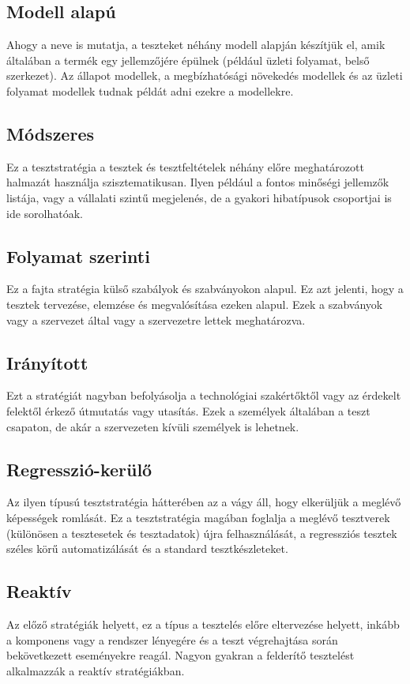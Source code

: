 \subsection{Modell alapú} Ahogy a neve is mutatja, a teszteket néhány modell alapján készítjük el, amik általában a termék egy jellemzőjére épülnek (például üzleti folyamat, belső szerkezet).	Az állapot modellek, a megbízhatósági növekedés modellek és az üzleti folyamat modellek tudnak példát adni ezekre a modellekre.


\subsection{Módszeres} Ez a tesztstratégia a tesztek és tesztfeltételek néhány előre meghatározott halmazát használja szisztematikusan. Ilyen például a fontos minőségi jellemzők listája, vagy a vállalati szintű megjelenés, de a  gyakori hibatípusok csoportjai is ide sorolhatóak.

\subsection{Folyamat szerinti} Ez a fajta stratégia külső szabályok és szabványokon alapul. Ez azt jelenti, hogy a tesztek tervezése, elemzése és megvalósítása ezeken alapul. Ezek a szabványok vagy a szervezet által vagy a szervezetre lettek meghatározva.

\subsection{Irányított} Ezt a stratégiát nagyban befolyásolja a technológiai szakértőktől vagy az érdekelt felektől érkező útmutatás vagy utasítás. Ezek a személyek általában a teszt csapaton, de akár a szervezeten kívüli személyek is lehetnek.

\subsection{Regresszió-kerülő} Az ilyen típusú tesztstratégia hátterében az a vágy áll, hogy elkerüljük a meglévő képességek romlását. Ez a tesztstratégia magában foglalja a meglévő tesztverek (különösen a tesztesetek és tesztadatok) újra felhasználását, a regressziós tesztek széles körű automatizálását és a standard tesztkészleteket\cite{syllabus4}.

\subsection{Reaktív} Az előző stratégiák helyett, ez a típus a tesztelés előre eltervezése helyett, inkább a komponens vagy a rendszer lényegére és a teszt végrehajtása során bekövetkezett eseményekre reagál. Nagyon gyakran a felderítő tesztelést alkalmazzák a reaktív stratégiákban\cite{syllabus4}.


